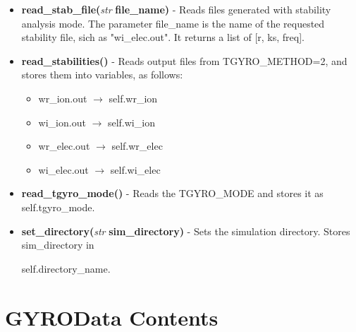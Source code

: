 \documentclass{article}
\begin{document}
\begin{itemize}
\item \textbf{read\_stab\_file(}\emph{str}\textbf{ file\_name)} - Reads files generated with stability analysis mode.  The parameter file\_name is the name of the requested stability file, sich as "wi\_elec.out".  It returns a list of [r, ks, freq].
\item \textbf{read\_stabilities()} - Reads output files from TGYRO\_METHOD=2, and stores them into variables, as follows:
\begin{itemize}
\item wr\_ion.out $\rightarrow$ self.wr\_ion
\item wi\_ion.out $\rightarrow$ self.wi\_ion
\item wr\_elec.out $\rightarrow$ self.wr\_elec
\item wi\_elec.out $\rightarrow$ self.wi\_elec
\end{itemize}
\item \textbf{read\_tgyro\_mode()} - Reads the TGYRO\_MODE and stores it as self.tgyro\_mode.
\item \textbf{set\_directory(}\emph{str}\textbf{ sim\_directory)} - Sets the simulation directory.  Stores sim\_directory in

self.directory\_name.
\end{itemize}

\newpage
\section{GYROData Contents}
\end{document}
